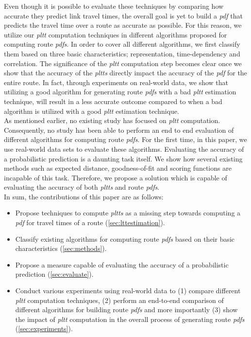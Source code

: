 Even though it is possible to evaluate these techniques by comparing how accurate they predict link travel times, the overall goal is yet to build a \textit{pdf} that predicts the travel time over a route as accurate as possible. For this reason, we utilize our \textit{pltt} computation techniques in different algorithms proposed for computing route \textit{pdfs}. In order to cover all different algorithms, we first classify them based on three basic characteristics; representation, time-dependency and correlation. The significance of the \textit{pltt} computation step becomes clear once we show that the accuracy of the \textit{pltts} directly impact the accuracy of the \textit{pdf} for the entire route. In fact, through experiments on real-world data, we show that utilizing a good algorithm for generating route \textit{pdfs} with a bad \textit{pltt} estimation technique, will result in a less accurate outcome compared to when a bad algorithm is utilized with a good \textit{pltt} estimation technique.\\
As mentioned earlier, no existing study has focused on \textit{pltt} computation. Consequently, no study has been able to perform an end to end evaluation of different algorithms for computing route \textit{pdfs}. For the first time, in this paper, we use real-world data sets to evaluate these algorithms. Evaluating the accuracy of a probabilistic prediction is a daunting task itself. We show how several existing methods such as expected distance, goodness-of-fit and scoring functions are incapable of this task. Therefore, we propose a solution which is capable of evaluating the accuracy of both \textit{pltts} and route \textit{pdfs}.\\
In sum, the contributions of this paper are as follows:
\begin{itemize}
\item Propose techniques to compute \textit{pltts} as a missing step towards computing a \textit{pdf} for travel times of a route (\cref{sec:lttestimation}).
\item Classify existing algorithms for computing route \textit{pdfs} based on their basic characteristics (\cref{sec:methods}).
\item Propose a measure capable of evaluating the accuracy of a probabilistic prediction (\cref{sec:evaluate}).
\item Conduct various experiments using real-world data to (1) compare different \textit{pltt} computation techniques, (2) perform an end-to-end comparison of different algorithms for building route \textit{pdfs} and more importantly (3) show the impact of \textit{pltt} computation in the overall process of generating route \textit{pdfs} (\cref{sec:experiments}).
\end{itemize} 

